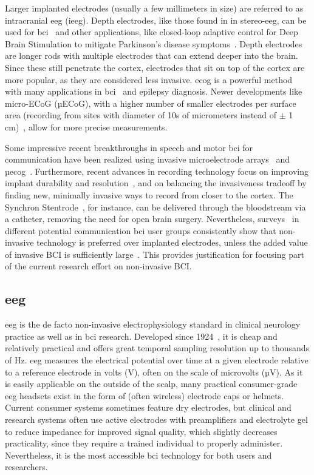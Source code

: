 Larger implanted electrodes (usually a few millimeters in size) are referred to
as intracranial \ac{eeg} (i\ac{eeg}).
Depth electrodes, like those found in in stereo-\ac{eeg}, can be used for \ac{bci}~\cite{Wu2024}
 and other applications, like closed-loop adaptive control for Deep Brain Stimulation
 to mitigate Parkinson's disease
symptoms~\cite{Arlotti2018}.
Depth electrodes are longer rods with multiple electrodes that can extend deeper into
the brain.
Since these still penetrate the cortex, electrodes that sit on top of the cortex are
more popular, as they are considered less invasive.
\Ac{ecog} is a powerful method with many applications in \ac{bci}~\cite{Schalk2011} and
epilepsy diagnosis.
Newer developments like micro-ECoG (µECoG), with a higher
number of smaller electrodes per surface area (recording from sites with
diameter of 10s of micrometers instead of $\pm$ 1 cm)~\cite{Shokoueinejad2019},
allow for more precise measurements.

Some impressive recent breakthroughs in speech and motor \ac{bci} for communication have
been realized using invasive microelectrode arrays~\cite{Willett2021} and
µ\Ac{ecog}~\cite{Metzger2023}.
Furthermore, recent advances in recording technology focus on improving implant
durability and resolution~\cite{Steinmetz2021}, and on balancing the invasiveness
tradeoff by finding new, minimally invasive ways to record from closer to the cortex.
The Synchron Stentrode~\cite{Mitchell2023}, for instance, can be delivered through the
bloodstream via a catheter, removing the need for open brain surgery.
Nevertheless, surveys~\cite{Huggins2011, Huggins2015, Branco2021} in different
potential communication \ac{bci} user groups consistently show that non-invasive
technology is preferred over implanted electrodes, unless the added value of invasive
BCI is sufficiently large~\cite{Kageyama2020}.
This provides justification for focusing part of the current research effort on
non-invasive BCI.

\subsection{\Acl{eeg}}

\Ac{eeg} is the de facto non-invasive electrophysiology standard in clinical neurology
practice as well as in \ac{bci} research.
Developed since 1924~\cite{Berger1929}, it is cheap and relatively practical and offers
great temporal sampling resolution up to thousands of Hz.
\Ac{eeg} measures the electrical potential over time at a given electrode relative to a
reference electrode in volts (V), often on the scale of microvolts (µV).
As it is easily applicable on the outside of the scalp, many practical consumer-grade
\ac{eeg} headsets exist in the form of (often wireless) electrode caps or helmets.
Current consumer systems sometimes feature dry electrodes, but clinical and research
systems often use active electrodes with preamplifiers and electrolyte gel to reduce
impedance for improved signal quality, which slightly decreases practicality, since they
require a trained individual to properly administer.
Nevertheless, it is the most accessible \ac{bci} technology for both users and
researchers.

